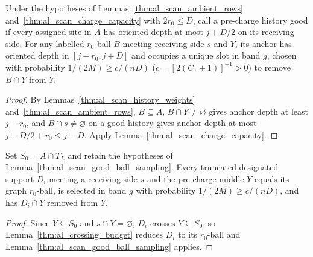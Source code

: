 \begin{lemma}
    \label{thm:al_scan_good_ball_sampling}
    \leanok
    Under the hypotheses of Lemmas~\ref{thm:al_scan_ambient_rows}
    and~\ref{thm:al_scan_charge_capacity} with $2r_0\le D$, call a pre-charge
    history good if every assigned site in $A$ has oriented depth at most
    $j+D/2$ on its receiving side. For any labelled $r_0$-ball $B$ meeting
    receiving side $s$ and $Y$, its anchor has oriented depth in $[j-r_0,j+D]$
    and occupies a unique slot in band $g$, chosen with probability
    $1/(2M)\ge c/(nD)$ ($c=[2(C_1+1)]^{-1}>0$) to remove $B\cap Y$ from $Y$.
\end{lemma}
\begin{proof}\leanok
    By Lemmas~\ref{thm:al_scan_history_weights}
    and~\ref{thm:al_scan_ambient_rows}, $B\subseteq A$, $B\cap Y\ne\varnothing$
    gives anchor depth at least $j-r_0$, and $B\cap s\ne\varnothing$ on a good
    history gives anchor depth at most $j+D/2+r_0\le j+D$. Apply
    Lemma~\ref{thm:al_scan_charge_capacity}.
\end{proof}

\begin{lemma}
    \label{thm:al_scan_designated_sampling}
    \leanok
    Set $S_0=A\cap T_L$ and retain the hypotheses of
    Lemma~\ref{thm:al_scan_good_ball_sampling}. Every truncated designated
    support $D_i$ meeting a receiving side $s$ and the pre-charge middle $Y$
    equals its graph $r_0$-ball, is selected in band $g$ with probability
    $1/(2M)\ge c/(nD)$, and has $D_i\cap Y$ removed from $Y$.
\end{lemma}
\begin{proof}\leanok
    Since $Y\subseteq S_0$ and $s\cap Y=\varnothing$, $D_i$ crosses $Y\subseteq S_0$,
    so Lemma~\ref{thm:al_crossing_budget} reduces $D_i$ to its $r_0$-ball and
    Lemma~\ref{thm:al_scan_good_ball_sampling} applies.
\end{proof}

